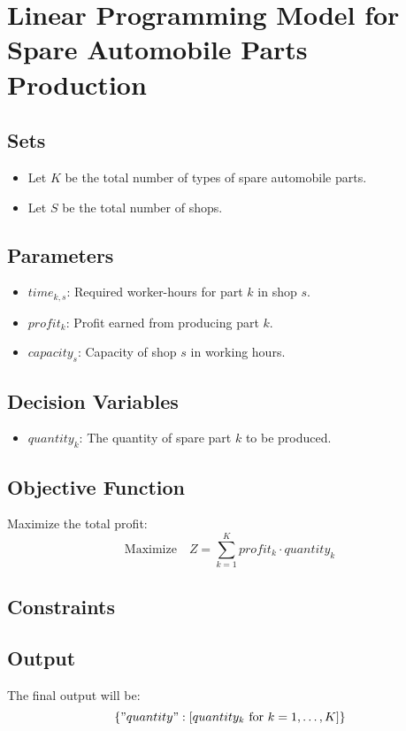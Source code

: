 \documentclass{article}
\begin{document}
\section*{Linear Programming Model for Spare Automobile Parts Production}

\subsection*{Sets}
\begin{itemize}
    \item Let \( K \) be the total number of types of spare automobile parts.
    \item Let \( S \) be the total number of shops.
\end{itemize}

\subsection*{Parameters}
\begin{itemize}
    \item \( time_{k,s} \): Required worker-hours for part \( k \) in shop \( s \).
    \item \( profit_{k} \): Profit earned from producing part \( k \).
    \item \( capacity_{s} \): Capacity of shop \( s \) in working hours.
\end{itemize}

\subsection*{Decision Variables}
\begin{itemize}
    \item \( quantity_{k} \): The quantity of spare part \( k \) to be produced.
\end{itemize}

\subsection*{Objective Function}
Maximize the total profit:
\[
\text{Maximize} \quad Z = \sum_{k=1}^{K} profit_{k} \cdot quantity_{k}
\]

\subsection*{Constraints}
\]

\subsection*{Output}
The final output will be:
\[
\{ "quantity": [quantity_{k} \text{ for } k = 1, \ldots, K] \}
\]
\end{document}
